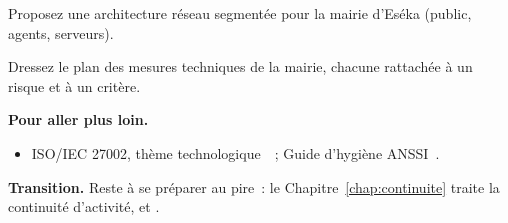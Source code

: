 \begin{boxexo}[title={\ding{45}\quad Exercice~16.9. Architecture \niveauexpert}]
Proposez une architecture réseau segmentée pour la mairie d'Eséka (public,
agents, serveurs).
\end{boxexo}

\begin{boxexo}[title={\ding{45}\quad Exercice~16.10. Plan technique \niveauexpert}]
Dressez le plan des mesures techniques de la mairie, chacune rattachée à un
risque et à un critère.
\end{boxexo}

\bigskip

\begin{boxinfo}
\textbf{Pour aller plus loin.}
\begin{itemize}
    \item ISO/IEC 27002, thème technologique~\cite{iso27002}~; Guide d'hygiène
          ANSSI~\cite{anssihygiene2017}.
\end{itemize}
\end{boxinfo}

\begin{boxinfo}
\textbf{Transition.} Reste à se préparer au pire~: le Chapitre~\ref{chap:continuite}
traite la continuité d'activité,  et .
\end{boxinfo}

